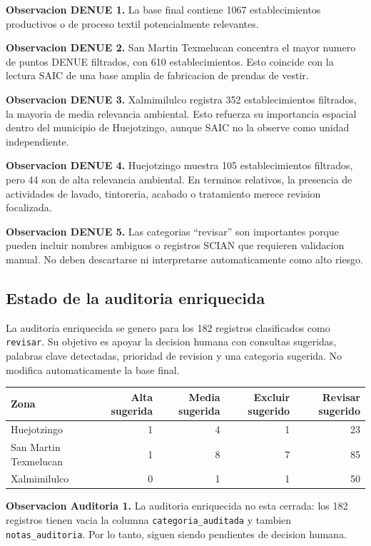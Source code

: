 \documentclass[11pt,letterpaper]{article}
\begin{document}
\textbf{Observacion DENUE 1.} La base final contiene 1067 establecimientos productivos o de proceso textil potencialmente relevantes.

\textbf{Observacion DENUE 2.} San Martin Texmelucan concentra el mayor numero de puntos DENUE filtrados, con 610 establecimientos. Esto coincide con la lectura SAIC de una base amplia de fabricacion de prendas de vestir.

\textbf{Observacion DENUE 3.} Xalmimilulco registra 352 establecimientos filtrados, la mayoria de media relevancia ambiental. Esto refuerza su importancia espacial dentro del municipio de Huejotzingo, aunque SAIC no la observe como unidad independiente.

\textbf{Observacion DENUE 4.} Huejotzingo muestra 105 establecimientos filtrados, pero 44 son de alta relevancia ambiental. En terminos relativos, la presencia de actividades de lavado, tintoreria, acabado o tratamiento merece revision focalizada.

\textbf{Observacion DENUE 5.} Las categorias ``revisar'' son importantes porque pueden incluir nombres ambiguos o registros SCIAN que requieren validacion manual. No deben descartarse ni interpretarse automaticamente como alto riesgo.

\subsection{Estado de la auditoria enriquecida}

La auditoria enriquecida se genero para los 182 registros clasificados como \texttt{revisar}. Su objetivo es apoyar la decision humana con consultas sugeridas, palabras clave detectadas, prioridad de revision y una categoria sugerida. No modifica automaticamente la base final.

\begin{longtable}{p{4cm}rrrr}
\toprule
Zona & Alta sugerida & Media sugerida & Excluir sugerido & Revisar sugerido \\
\midrule
Huejotzingo & 1 & 4 & 1 & 23 \\
San Martin Texmelucan & 1 & 8 & 7 & 85 \\
Xalmimilulco & 0 & 1 & 1 & 50 \\
\bottomrule
\end{longtable}

\textbf{Observacion Auditoria 1.} La auditoria enriquecida no esta cerrada: los 182 registros tienen vacia la columna \texttt{categoria\_auditada} y tambien \texttt{notas\_auditoria}. Por lo tanto, siguen siendo pendientes de decision humana.
\end{document}
